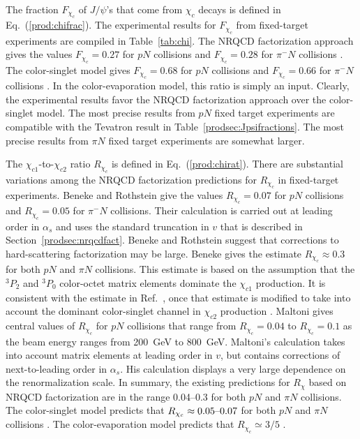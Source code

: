 The fraction $F_{\chi_c}$ of $J/\psi$'s that come from $\chi_c$ decays
is defined in Eq.~(\ref{prod:chifrac}).
The experimental results for $F_{\chi_c}$ from fixed-target experiments
are compiled in Table~\ref{tab:chi}.
The NRQCD factorization approach gives the values 
$F_{\chi_c}=0.27$ for $pN$ collisions 
and $F_{\chi_c}=0.28$ for $\pi^-N$ collisions
\cite{Beneke:1996tk}. The color-singlet model gives 
$F_{\chi_c}=0.68$ for $pN$ collisions and 
$F_{\chi_c}=0.66$ for $\pi^-N$ collisions 
\cite{Beneke:1996tk}. In the color-evaporation model, 
this ratio is simply an input. 
Clearly, the experimental results favor the NRQCD factorization
approach over the color-singlet model.  
The most precise results from $pN$ fixed target experiments are 
compatible with the Tevatron result in Table~\ref{prodsec:Jpsifractions}.
The most precise results from $\pi N$ fixed target experiments
are somewhat larger.


The $\chi_{c1}$-to-$\chi_{c2}$ ratio $R_{\chi_c}$ 
is defined in Eq.~(\ref{prod:chirat}).
There are substantial variations among the NRQCD factorization
predictions for $R_{\chi_c}$ in fixed-target
experiments. Beneke and Rothstein \cite{Beneke:1996tk} give the values
$R_{\chi_c}=0.07$ for $pN$ collisions and $R_{\chi_c}=0.05$ for $\pi^-N$
collisions. Their calculation is carried out at leading order in
$\alpha_s$ and uses the standard truncation in $v$ that is described in
Section~\ref{prodsec:nrqcdfact}. Beneke and Rothstein \cite{Beneke:1996tk}
suggest that corrections to hard-scattering factorization may be large.
Beneke \cite{Beneke:1997av} gives the estimate $R_{\chi_c}\approx 0.3$
for both $pN$ and $\pi N$ collisions. This estimate is based on the
assumption that the ${}^3P_2$ and ${}^3P_0$ color-octet matrix elements
dominate the $\chi_{c1}$ production. It is consistent with the
estimate in Ref.~\cite{Gupta:1997me}, once that estimate is modified to
take into account the dominant color-singlet channel in $\chi_{c2}$
production \cite{Beneke:1997av}. Maltoni \cite{Maltoni:2000km} gives
central values of $R_{\chi_c}$ for $pN$ collisions that range from
$R_{\chi_c}=0.04$ to $R_{\chi_c}=0.1$ as the beam energy ranges from
200~GeV to 800~GeV. Maltoni's calculation takes into account matrix
elements at leading order in $v$, but contains corrections of
next-to-leading order in $\alpha_s$. His calculation displays a very
large dependence on the renormalization scale. In summary, the existing
predictions for $R_\chi$ based on NRQCD factorization are in the range
0.04--0.3 for both $pN$ and $\pi N$ collisions. The color-singlet model
predicts that $R_{\chi_c}\approx 0.05\hbox{--}0.07$ for both $pN$
and $\pi N$ collisions \cite{Beneke:1996tk,Beneke:1997av}. The
color-evaporation model predicts that $R_{\chi_c} \simeq 3/5$
\cite{Amundson:1995em,Amundson:1996qr}.

